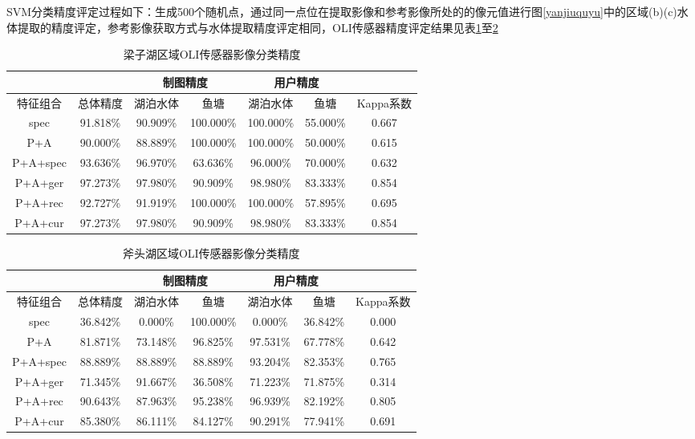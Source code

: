 \documentclass[supercite]{upcthesis}
\begin{document}
SVM分类精度评定过程如下：生成500个随机点，通过同一点位在提取影像和参考影像所处的的像元值进行图\ref{yanjiuquyu}中的区域(b)(c)水体提取的精度评定，参考影像获取方式与水体提取精度评定相同，OLI传感器精度评定结果见表\ref{oli_lzh_jindu}至\ref{oli_fth_jindu}
\begin{table}[htbp]
	\small
	\newcommand{\tabincell}[2]{\begin{tabular}{@{}#1@{}}#2\end{tabular}}  
	\centering
	\caption{梁子湖区域OLI传感器影像分类精度}
	\begin{tabular}{ccccccc}
		\toprule
			&  &\multicolumn{2}{c}{制图精度}&\multicolumn{2}{c}{用户精度} &\\ \midrule 
		特征组合&总体精度  &湖泊水体    & 鱼塘  &湖泊水体&鱼塘&Kappa系数\\
		spec&	91.818\%&	90.909\%&	100.000\%&	100.000\%&	55.000\%&	0.667\\
		P+A&	90.000\%&	88.889\%&	100.000\%&	100.000\%&	50.000\%&	0.615\\
		P+A+spec&	93.636\%&	96.970\%&	63.636\%&	96.000\%&	70.000\%&	0.632\\
		P+A+ger&	97.273\%&	97.980\%&	90.909\%&	98.980\%&	83.333\%&	0.854\\
		P+A+rec&	92.727\%&	91.919\%&	100.000\%&	100.000\%&	57.895\%&	0.695\\
		P+A+cur&	97.273\%&	97.980\%&	90.909\%&	98.980\%&	83.333\%&0.854\\   \bottomrule
	\end{tabular}
	\label{oli_lzh_jindu}
\end{table}
\begin{table}[b]
	\small
	\newcommand{\tabincell}[2]{\begin{tabular}{@{}#1@{}}#2\end{tabular}}  
	\centering
	\caption{斧头湖区域OLI传感器影像分类精度}
	\begin{tabular}{ccccccc}
		\toprule
		&  &\multicolumn{2}{c}{制图精度}&\multicolumn{2}{c}{用户精度} &\\ \midrule 
		特征组合&总体精度  &湖泊水体    & 鱼塘  &湖泊水体&鱼塘&Kappa系数\\
		spec&	36.842\%&	0.000\%&	100.000\%&	0.000\%&	36.842\%&	0.000\\
		P+A&	81.871\%&	73.148\%&	96.825\%&	97.531\%&	67.778\%&	0.642\\
		P+A+spec&	88.889\%&	88.889\%&	88.889\%&	93.204\%&	82.353\%&	0.765\\
		P+A+ger&	71.345\%&	91.667\%&	36.508\%&	71.223\%&	71.875\%&	0.314\\
		P+A+rec&	90.643\%&	87.963\%&	95.238\%&	96.939\%&	82.192\%&	0.805\\
		P+A+cur&	85.380\%&	86.111\%&	84.127\%&	90.291\%&	77.941\%&	0.691\\
		\bottomrule
	\end{tabular}
	\label{oli_fth_jindu}
\end{table}
\end{document}
